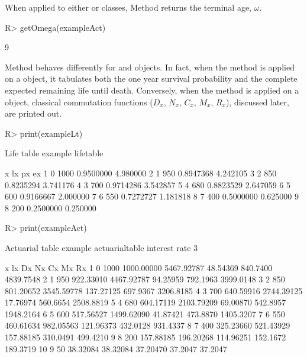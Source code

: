 \documentclass[nojss]{jss}
\begin{document}
When applied to
either  or  classes, Method   returns the terminal age, $\omega$.

\begin{Schunk}
\begin{Sinput}
R> getOmega(exampleAct)
\end{Sinput}
\begin{Soutput}
[1] 9
\end{Soutput}
\end{Schunk}

Method  behaves differently for  and 
 objects. In fact, when the  method is applied on a
 object, it tabulates both the one year survival probability and the complete
expected remaining life until death. Conversely, when the  method is
applied on a  object, classical commutation
functions ($D_x$, $N_x$, $C_x$, $M_x$, $R_x$), discussed later, are printed out.

\begin{Schunk}
\begin{Sinput}
R> print(exampleLt)
\end{Sinput}
\begin{Soutput}
Life table example lifetable 

  x   lx        px       ex
1 0 1000 0.9500000 4.980000
2 1  950 0.8947368 4.242105
3 2  850 0.8235294 3.741176
4 3  700 0.9714286 3.542857
5 4  680 0.8823529 2.647059
6 5  600 0.9166667 2.000000
7 6  550 0.7272727 1.181818
8 7  400 0.5000000 0.625000
9 8  200 0.2500000 0.250000
\end{Soutput}
\begin{Sinput}
R> print(exampleAct)
\end{Sinput}
\begin{Soutput}
Actuarial table  example actuarialtable interest rate  3 %

   x   lx         Dx         Nx        Cx       Mx        Rx
1  0 1000 1000.00000 5467.92787  48.54369 840.7400 4839.7548
2  1  950  922.33010 4467.92787  94.25959 792.1963 3999.0148
3  2  850  801.20652 3545.59778 137.27125 697.9367 3206.8185
4  3  700  640.59916 2744.39125  17.76974 560.6654 2508.8819
5  4  680  604.17119 2103.79209  69.00870 542.8957 1948.2164
6  5  600  517.56527 1499.62090  41.87421 473.8870 1405.3207
7  6  550  460.61634  982.05563 121.96373 432.0128  931.4337
8  7  400  325.23660  521.43929 157.88185 310.0491  499.4210
9  8  200  157.88185  196.20268 114.96251 152.1672  189.3719
10 9   50   38.32084   38.32084  37.20470  37.2047   37.2047
\end{Soutput}
\end{Schunk}
\end{document}

